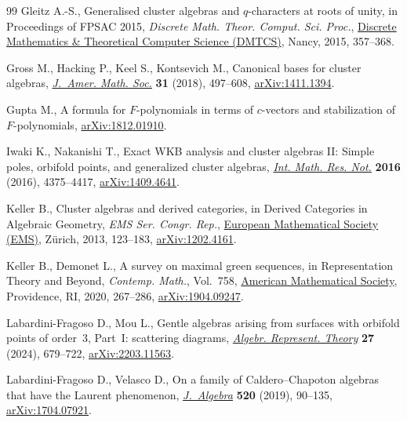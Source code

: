 \documentclass[10pt,a4paper]{amsart}
\numberwithin{equation}{section}
\begin{document}
\begin{thebibliography}{99}
Gleitz A.-S., Generalised cluster algebras and {$q$}-characters at roots of
  unity, in Proceedings of {FPSAC} 2015, \textit{Discrete Math. Theor. Comput. Sci. Proc.}, \href{https://doi.org/10.46298/dmtcs.2479}{Discrete Mathematics \& Theoretical Computer Science (DMTCS)}, Nancy,
  2015, 357--368.

Gross M., Hacking P., Keel S., Kontsevich M., Canonical bases for cluster
  algebras,  \href{https://doi.org/10.1090/jams/890}{\textit{J.~Amer. Math. Soc.}} \textbf{31} (2018), 497--608,
  \href{https://arxiv.org/abs/1411.1394}{arXiv:1411.1394}.

Gupta M., A formula for {$F$}-polynomials in terms of $c$-vectors and
  stabilization of {$F$}-polynomials, \href{https://arxiv.org/abs/1812.01910}{arXiv:1812.01910}.

Iwaki K., Nakanishi T., Exact {WKB} analysis and cluster algebras {II}:
  {S}imple poles, orbifold points, and generalized cluster algebras,
  \href{https://doi.org/10.1093/imrn/rnv270}{\textit{Int. Math. Res. Not.}} \textbf{2016} (2016), 4375--4417,
  \href{https://arxiv.org/abs/1409.4641}{arXiv:1409.4641}.

Keller B., Cluster algebras and derived categories, in Derived {C}ategories in
  {A}lgebraic {G}eometry, \textit{EMS Ser. Congr. Rep.},  \href{https://doi.org/10.4171/115-1/6}{European Mathematical Society (EMS)}, Z\"urich, 2013, 123--183, \href{https://arxiv.org/abs/1202.4161}{arXiv:1202.4161}.

Keller B., Demonet L., A survey on maximal green sequences, in Representation
  {T}heory and {B}eyond, \textit{Contemp. Math.}, Vol.~758, \href{https://doi.org/10.1090/conm/758/15239}{American
  Mathematical Society}, Providence, RI, 2020, 267--286, \href{https://arxiv.org/abs/1904.09247}{arXiv:1904.09247}.

Labardini-Fragoso D., Mou L., Gentle algebras arising from surfaces with
  orbifold points of order~3, Part~{I}: scattering diagrams, \href{https://doi.org/10.1007/s10468-023-10233-x}{\textit{Algebr.
  Represent. Theory}} \textbf{27} (2024), 679--722, \href{https://arxiv.org/abs/2203.11563}{arXiv:2203.11563}.

Labardini-Fragoso D., Velasco D., On a family of {C}aldero--{C}hapoton algebras
  that have the {L}aurent phenomenon, \href{https://doi.org/10.1016/j.jalgebra.2018.11.012}{\textit{J.~Algebra}} \textbf{520} (2019),
  90--135, \href{https://arxiv.org/abs/1704.07921}{arXiv:1704.07921}.


\end{thebibliography}
\end{document}
